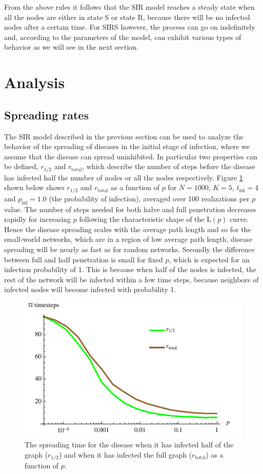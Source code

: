 \documentclass[10pt,a4paper]{article}
\begin{document}
From the above rules it follows that the SIR model reaches a steady state when all the nodes are either in state S or state R, because there will be no infected nodes after a certain time. For SIRS however, the process can go on indefinitely and, according to the parameters of the model, can exhibit various types of behavior as we will see in the next section.

\section{Analysis}
\subsection{Spreading rates}
\noindent The SIR model described in the previous section can be used to analyze the behavior of the spreading of diseases in the initial stage of infection, where we assume that the disease can spread uninhibited. In particular two properties can be defined, $r_{1/2}$ and $r_{\text{total}}$, which describe the number of steps before the disease has infected half the number of nodes or all the nodes respectively. Figure \ref{fig:r} shown below shows $r_{1/2}$ and $r_{\text{total}}$ as a function of $p$ for $N = 1000$, $K = 5$, $t_{\text{inf}} = 4$ and $p_{\text{inf}} = 1.0$ (the probability of infection), averaged over 100 realizations per $p$ value. The number of steps needed for both halve and full penetration decreases rapidly for increasing $p$ following the characteristic shape of the L$(p)$ curve. Hence the disease spreading scales with the average path length and so for the small-world networks, which are in a region of low average path length, disease spreading will be nearly as fast as for random networks. Secondly the difference between full and half penetration is small for fixed $p$, which is expected for an infection probability of 1. This is because when half of the nodes is infected, the rest of the network will be infected within a few time steps, because neighbors of infected nodes will become infected with probability 1.

\begin{figure}[H]
  \centering
  \includegraphics[scale=1.1]{r.pdf}
  \caption{The spreading time for the disease when it has infected half of the graph ($r_{1/2}$) and when it has infected the full graph ($r_{\text{total}}$) as a function of $p$.}
  \label{fig:r}
\end{figure}
\end{document}
